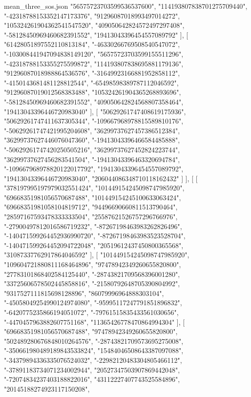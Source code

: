 \begin{filecontents*}[overwrite]{mean_three_sos.json}
    "56575723703599536537600",
    "114193807838701275709440",
    "-42318788153352147173376",
    "91296087018993497014272",
    "105324261904362541547520",
    "409050642824572497297408",
    "-58128450969460682391552",
    "19413043396454557089792"
   ],
   [
    "61428051897552110813184",
    "-46330266769508540547072",
    "-103008441947094838149120",
    "56575723703599155511296",
    "-42318788153355275599872",
    "114193807838695881179136",
    "91296087018988864536576",
    "-31649923166881952858112",
    "-4150143681481128812544",
    "-65498598389787112046592",
    "91296087019012568383488",
    "105324261904365268893696",
    "-58128450969460682391552",
    "409050642824568807358464",
    "19413043396446720983040"
   ],
   [
    "50629261747408619175936",
    "50629261747411637305344",
    "-109667968978815589810176",
    "-50629261747421995204608",
    "36299737627457386512384",
    "36299737627446076047360",
    "-19413043396466584485888",
    "-50629261747420250505216",
    "36299737627452824223744",
    "36299737627456283541504",
    "-19413043396463320694784",
    "-109667968978820122017792",
    "19413043396454557089792",
    "19413043396446720983040",
    "206044086348710118162432"
   ]
  ],
  [
   [
    "378197995197979032551424",
    "101449154245098747985920",
    "69668351981056570687488",
    "101449154245100633063424",
    "69668351981058104819712",
    "94496690660811513790464",
    "28597167593478333333504",
    "25587621526757296766976",
    "-27900497812016586719232",
    "-87267198463983262826496",
    "-140471599264452936990720",
    "-87267198463983523528704",
    "-140471599264452094722048",
    "20519612437450800365568",
    "31087337762917864046592"
   ],
   [
    "101449154245098747985920",
    "109604721880811168464896",
    "97478942349260655820800",
    "27783101868402584125440",
    "-28743821709568396001280",
    "33725606578502445858816",
    "-21580792648705390804992",
    "9317527111815698128896",
    "86079996964888303104",
    "-45058049254990124974080",
    "-95995117247791851896832",
    "-6420775235866194051072",
    "-79761515835433561030656",
    "-4470457963882607751168",
    "11365426778470864994304"
   ],
   [
    "69668351981056570687488",
    "97478942349260655820800",
    "502489280676848010264576",
    "-28743821709573695275008",
    "-350661980489189843533824",
    "15484046508643387097088",
    "-34379894336335076524032",
    "-22982120483304805466112",
    "-37891183734071234002944",
    "20527347503907869442048",
    "-72074834237403188822016",
    "43112227407743525584896",
    "20145188274923117150208",

\end{filecontents*}

